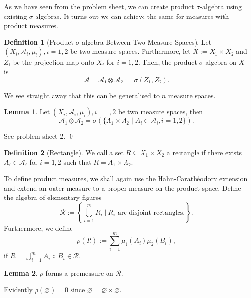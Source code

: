 \documentclass[
]{article}
\theoremstyle{definition}
\theoremstyle{definition}
\newtheorem{definition}{Definition}[section]
\newtheorem{lemma}{Lemma}[section]
\begin{document}
As we have seen from the problem sheet, we can create product
\(\sigma\)-algebra using existing \(\sigma\)-algebras. It turns out we
can achieve the same for measures with product measures.

\begin{definition}[Product \(\sigma\)-algebra Between Two Measure Spaces]
  Let \((X_i, \mathcal{A}_i, \mu_i), i = 1, 2\) be two measure spaces. Furthermore,
  let \(X := X_1 \times X_2\) and \(Z_i\) be the projection map onto \(X_i\) for 
  \(i = 1, 2\). Then, the product \(\sigma\)-algebra on \(X\) is 
  \[\mathcal{A} = \mathcal{A}_1 \otimes \mathcal{A}_2 := \sigma(Z_1, Z_2).\]
\end{definition}

We see straight away that this can be generalised to \(n\) measure
spaces.

\begin{lemma}
  Let \((X_i, \mathcal{A}_i, \mu_i), i = 1, 2\) be two measure spaces, then
  \[\mathcal{A}_1 \otimes \mathcal{A}_2 
    = \sigma(\{A_1 \times A_2 \mid A_i \in \mathcal{A}_i, i = 1, 2\}).\]
\end{lemma}
\proof

See problem sheet 2. \qed

\begin{definition}[Rectangle]
  We call a set \(R \subseteq X_1 \times X_2\) a rectangle if there exists 
  \(A_i \in \mathcal{A}_i\) for \(i = 1, 2\) such that \(R = A_1 \times A_2\).
\end{definition}

To define product measures, we shall again use the Hahn-Carathéodory
extension and extend an outer measure to a proper measure on the product
space. Define the algebra of elementary figures
\[\mathcal{R} := \left\{\bigcup_{i = 1}^m R_i 
  \mid R_i \text{ are disjoint rectangles.}\right\}.\] Furthermore, we
define \[\rho(R) := \sum_{i = 1}^m \mu_1(A_i) \mu_2(B_i),\] if
\(R = \bigcup_{i = 1}^m A_i \times B_i \in \mathcal{R}\).

\begin{lemma}
  \(\rho\) forms a premeasure on \(\mathcal{R}\).
\end{lemma}
\proof

Evidently \(\rho(\varnothing) = 0\) since
\(\varnothing = \varnothing \times \varnothing\).
\end{document}
